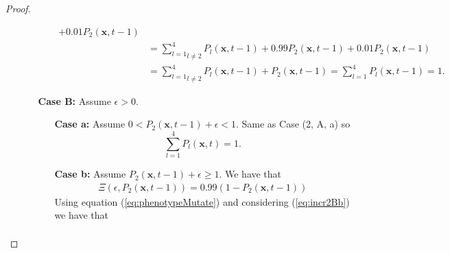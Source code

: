 \documentclass[\main/thesis.tex]{subfiles}
\begin{document}
\begin{proof}
\begin{itemize}
\begin{itemize}
\begin{itemize}
\begin{align*}
                                                       {+} 0.01 P_2(\boldsymbol{x}, t{-}1) \\
                                                      &{=} \underset{l {\ne} 2}{\sum_{l{=}1}^4} P_l(\boldsymbol{x}, t{-}1)
                                                       {+} 0.99 P_2(\boldsymbol{x}, t{-}1)
                                                       {+} 0.01 P_2(\boldsymbol{x}, t{-}1) \\
                                                      &{=} \underset{l {\ne} 2}{\sum_{l{=}1}^4} P_l(\boldsymbol{x}, t{-}1)
                                                       {+} P_2(\boldsymbol{x}, t{-}1)
                                                       {=} \sum_{l{=}1}^4 P_l(\boldsymbol{x}, t{-}1) {=} 1.
                                                    \end{align*}
                             \end{itemize}
                             \item[{\bf Case B:}] Assume $\epsilon {>} 0$.
                             \begin{itemize}
                             	\item[{\bf Case a:}] Assume $0 {<} 
                             	                             P_2(\boldsymbol{x}, t{-}1) {+} \epsilon 
                             	                               {<} 1$. 
                             	                     Same as Case (2, A, a) so 
                             	                     $$\sum_{l{=}1}^4 P_l(\boldsymbol{x}, t) {=} 1.$$
                             	\item[{\bf Case b:}] Assume $P_2(\boldsymbol{x}, t{-}1) {+} \epsilon {\ge} 1$.
                             	                     We have that 
                             	                     \begin{align*}
                             	                       \Xi(\epsilon, P_2(\boldsymbol{x}, t{-}1))
                             	                       {=} 0.99 (1 {-} P_2(\boldsymbol{x}, t{-}1))
                             	                       \tag{24}
                             	                       \label{eq:incr2Bb}
                             	                     \end{align*}
                             	                     Using equation (\ref{eq:phenotypeMutate}) and considering 
                             	                     (\ref{eq:incr2Bb}) we have that
                             	                     \begin{align*}

\end{align*}
\end{itemize}
\end{itemize}
\end{itemize}
\end{proof}
\end{document}
